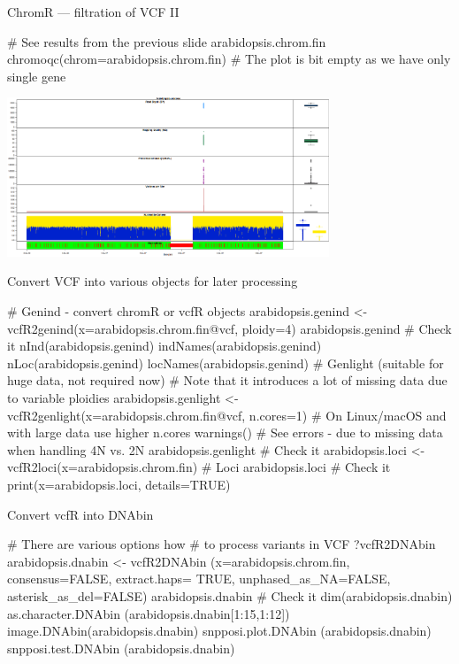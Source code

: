 \documentclass[compress, xelatex, 11pt, xcolor=svgnames, aspectratio=169,
	hyperref={
		bookmarks=true,
		unicode=true,
		colorlinks=true,
		pdftitle={Molecular data in R},
		plainpages=false,
		pdfauthor={Vojtech Zeisek},
		pdfsubject={Course about phylogeny and evolution in R},
		pdfcreator={XeLaTeX},
		pdfkeywords={R, evolution, phylogeny, molecular data},
		linkcolor=Crimson, %
		anchorcolor=Magenta, %
		citecolor=Magenta, %
		filecolor=Magenta, %
		menucolor=Magenta, %
		urlcolor=DodgerBlue, %
		},
	url={hyphens, lowtilde} %
	]{beamer}
\renewcommand{\texttt}[1]{\colorbox{Beige}{{\ttfamily #1}}}
\begin{document}
\begin{frame}[fragile]{ChromR --- filtration of VCF II}
	\begin{spluscode}
    # See results from the previous slide
    arabidopsis.chrom.fin
    chromoqc(chrom=arabidopsis.chrom.fin)
    # The plot is bit empty as we have only single gene
	\end{spluscode}
	\begin{center}
		\includegraphics[height=4.75cm]{chrom.png}
	\end{center}
\end{frame}

\begin{frame}[fragile]{Convert VCF into various objects for later processing}
	\begin{spluscode}
    # Genind - convert chromR or vcfR objects
    arabidopsis.genind <- vcfR2genind(x=arabidopsis.chrom.fin@vcf, ploidy=4)
    arabidopsis.genind # Check it
    nInd(arabidopsis.genind)
    indNames(arabidopsis.genind)
    nLoc(arabidopsis.genind)
    locNames(arabidopsis.genind)
    # Genlight (suitable for huge data, not required now)
    # Note that it introduces a lot of missing data due to variable ploidies
    arabidopsis.genlight <- vcfR2genlight(x=arabidopsis.chrom.fin@vcf,
      n.cores=1) # On Linux/macOS and with large data use higher n.cores
    warnings() # See errors - due to missing data when handling 4N vs. 2N
    arabidopsis.genlight # Check it
    arabidopsis.loci <- vcfR2loci(x=arabidopsis.chrom.fin) # Loci
    arabidopsis.loci # Check it
    print(x=arabidopsis.loci, details=TRUE)
	\end{spluscode}
\end{frame}

\begin{frame}[fragile]{Convert vcfR into DNAbin}
	\begin{multicols}{2}
	\begin{spluscode}
    # There are various options how
    # to process variants in VCF
    ?vcfR2DNAbin
    arabidopsis.dnabin <- vcfR2DNAbin
      (x=arabidopsis.chrom.fin,
      consensus=FALSE, extract.haps=
      TRUE, unphased_as_NA=FALSE,
      asterisk_as_del=FALSE)
    arabidopsis.dnabin # Check it
    dim(arabidopsis.dnabin)
    as.character.DNAbin
      (arabidopsis.dnabin[1:15,1:12])
    image.DNAbin(arabidopsis.dnabin)
    snpposi.plot.DNAbin
      (arabidopsis.dnabin)
    snpposi.test.DNAbin
      (arabidopsis.dnabin)
	\end{spluscode}
	\begin{center}
		\texttt{[image: vcf\_dna.png]}
	\end{center}
	\end{multicols}
\end{frame}
\end{document}
